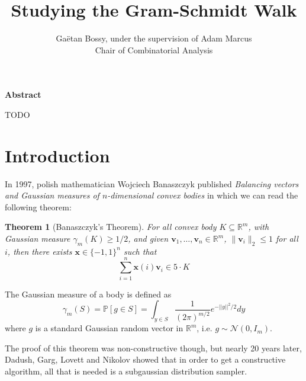 \documentclass[12pt]{article}
\title{Studying the Gram-Schmidt Walk}
\author{Gaëtan Bossy, under the supervision of Adam Marcus\\Chair of Combinatorial Analysis}
\newtheorem{theorem}{Theorem}
\begin{document}
\maketitle
\begin{center}\bf Abstract\end{center}
\small TODO


\section{Introduction}
In 1997, polish mathematician Wojciech Banaszczyk published \textit{Balancing vectors and Gaussian measures of $n$-dimensional convex bodies}\cite{banaszczyk1998balancing} in which we can read the following theorem:
\begin{theorem}[Banaszczyk's Theorem]\label{banaszczyk}
For all convex body $K \subseteq \mathbb{R}^m$, with Gaussian measure $\gamma_m(K)\geq 1/2$, and given $\textbf{v}_1, \dots, \textbf{v}_n \in \mathbb{R}^m$, $\|\textbf{v}_i\|_2 \leq 1$ for all $i$, then there exists $ \textbf{x} \in \{-1, 1\}^n$ such that
$$\sum_{i=1}^n \textbf{x}(i)\textbf{v}_i \in 5 \cdot K $$
\end{theorem}
The Gaussian measure of a body is defined as $$\gamma_m(S) = \mathbb{P}[g \in S] = \int_{y \in S} \frac{1}{(2 \pi)^{m/2}} e^{-||y||^2/2} dy$$
    where $g$ is a standard Gaussian random vector in $\mathbb{R}^m$, i.e. $g \sim \mathcal{N}(0, I_m)$. 

The proof of this theorem was non-constructive though, but nearly 20 years later, Dadush, Garg, Lovett and Nikolov showed that in order to get a constructive algorithm, all that is needed is a subgaussian distribution sampler. 
\end{document}
